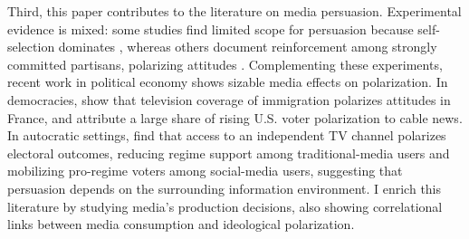 \documentclass[12pt]{article}
\begin{document}


Third, this paper contributes to the literature on media persuasion. Experimental evidence is mixed: some studies find limited scope for persuasion because self-selection dominates \citep{arceneaux_johnson_2013}, whereas others document reinforcement among strongly committed partisans, polarizing attitudes \citep{levendusky}. Complementing these experiments, recent work in political economy shows sizable media effects on polarization. In democracies, \citet{schneider2025media} show that television coverage of immigration polarizes attitudes in France, and \citet{martin2017} attribute a large share of rising U.S. voter polarization to cable news. In autocratic settings, \citet{enikolopov_tv}  find that access to an independent TV channel polarizes electoral outcomes, reducing regime support among traditional-media users and mobilizing pro-regime voters among social-media users, suggesting that persuasion depends on the surrounding information environment. I enrich this literature by studying media's production decisions, also showing correlational links between media consumption and ideological polarization.
\end{document}
